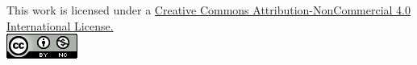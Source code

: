 \documentclass[12pt]{article}
\begin{document}
\vspace{2cm}
\begin{center}
    This work is licensed under a \href{https://creativecommons.org/licenses/by-nc/4.0/}{Creative Commons Attribution-NonCommercial 4.0 International License.}\\
    \includegraphics[scale=1]{figures/creativecommons.png}
\end{center}
\end{document}
